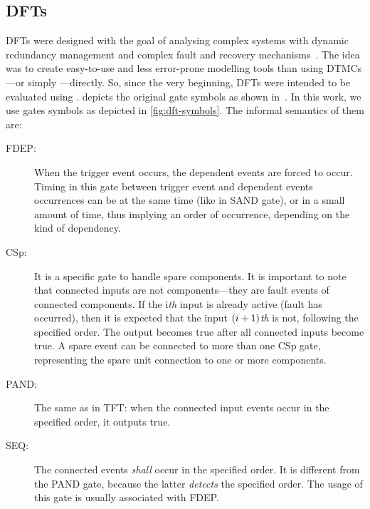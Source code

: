 \documentclass[12pt,openright,twoside,a4paper,oldfontcommands,english,brazil,final]{abntex2}
\theoremstyle{theo}
\newcommand{\parsin}[1]{\ensuremath\left( #1 \right)}
\begin{document}
\subsection{\Aclp*{DFT}}
\label{sec:dynamic-fault-trees}

\begin{sloppypar}
\Aclp{DFT} were designed with the goal of analysing complex systems with dynamic redundancy management and complex fault and recovery mechanisms~\cite{DBB1992}.
The idea was to create easy-to-use and less error-prone modelling tools than using \acp{DTMC}---or simply \emph{}---directly.
So, since the very beginning, \acp{DFT} were intended to be evaluated using .
 depicts the original gate symbols as shown in~\cite{DBB1992,Boyd1992}.
In this work, we use gates symbols as depicted in \cref{fig:dft-symbols}.
The informal semantics of them are:
%
\begin{description}
  \item[\Ac{FDEP}:]
  When the trigger event occurs, the dependent events are forced to occur.
  Timing in this gate between trigger event and dependent events occurrences can be at the same time (like in  \ac{SAND} gate), or in a small amount of time, thus implying an order of occurrence, depending on the kind of dependency.
  \item[\Ac{CSp}:]
  It is a specific gate to handle spare components.
  It is important to note that connected inputs are not components---they are fault events of connected components.
  If the i\emph{th} input is already active (fault has occurred), then it is expected that the input $\parsin{i+1}$\emph{th} is not, following the specified order.
  The output becomes true after all connected inputs become true.
  A spare event can be connected to more than one \ac{CSp} gate, representing the spare unit connection to one or more components.
  \item[\ac{PAND}:]
  The same as in \ac{TFT}: when the connected input events occur in the specified order, it outputs true.
  \item[\Ac{SEQ}:]
  The connected events \emph{shall} occur in the specified order.
  It is different from the \ac{PAND} gate, because the latter \emph{detects} the specified order.
  The usage of this gate is usually associated with \ac{FDEP}.
\end{description}
\end{sloppypar}
\end{document}

